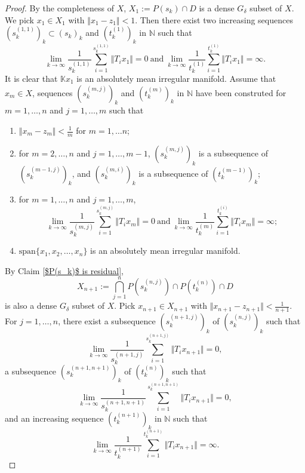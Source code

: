 \documentclass[12pt,a4paper]{amsart}
\theoremstyle{definition}
\theoremstyle{plain}
\begin{document}
\begin{proof}
    By the completeness of $X$, $X_1:=P(s_k)\cap D$ is a dense $G_{\delta}$ subset of $X$.
    We pick $x_1\in X_1$ with $\Vert x_1-z_1 \Vert <1$.
    Then there exist two increasing sequences $(s_k^{(1,1)})_k\subset (s_k)_k$
    and $(t_k^{(1)})_k$ in $\mathbb{N}$ such that
    \[
        \lim_{k\to \infty} \frac{1}{s_k^{(1,1)} } \sum_{i=1}^{s_k^{(1,1)}} \Vert T_{i}x_1 \Vert =0 \
        \text{and} \
        \lim_{k\to \infty} \frac{1}{t_k^{(1)}} \sum_{i=1}^{t_k^{(1)}} \Vert T_{i}x_1 \Vert =\infty.
    \]
    It is clear that $\mathbb{K}x_1$ is an absolutely mean irregular manifold.
    Assume that $x_m\in X$, sequences $(s_k^{(m,j)})_k$ and $(t_k^{(m)})_k$ in $\mathbb{N}$ have been construted for $m=1, \ldots,n$ and $j=1,\ldots, m$ such that
    \begin{enumerate}
        \item $\Vert x_m-z_m \Vert <\frac{1}{m}$ for $m=1, \ldots n$;
        \item for $m=2,\ldots, n$ and $j=1,\ldots, m-1$,
              $(s_k^{(m,j)})_k$ is a subsequence of $(s_k^{(m-1,j)})_k$, and $(s_k^{(m,i)})_k$ is a subsequence of $(t_k^{(m-1)})_k$;
        \item for $m=1, \ldots, n$ and $j=1, \ldots, m$,
              \[
                  \lim_{k\to \infty} \frac{1}{s_k^{(m,j)}} \sum_{i=1}^{ s_k^{(m,j)} } \Vert T_{i} x_m \Vert =0 \
                  \text{and} \
                  \lim_{k\to \infty} \frac{1}{t_k^{(m)}} \sum_{i=1}^{ t_k^{(i)} } \Vert T_{i} x_m \Vert =\infty;
              \]
        \item $\text{span} \{x_1, x_2, \ldots, x_n\} $ is an absolutely mean irregular manifold.
    \end{enumerate}
    By Claim \ref{$P(s_k)$ is residual},
    \[
        X_{n+1}:= \bigcap_{j=1}^n P(s_k^{(n,j)}) \cap P(t_k^{(n)}) \cap D
    \]
    is also a dense $G_{\delta}$ subset of $X$.
    Pick $x_{n+1}\in X_{n+1}$ with $\Vert x_{n+1} -z_{n+1} \Vert <\frac{1}{n+1}$.
    For $j=1, \ldots, n$, there exist a subsequence $(s_k^{(n+1, j)})_k$ of $(s_k^{(n, j)})_k$ such that
    \[
        \lim_{k\to \infty} \frac{1}{s_k^{(n+1, j)}} \sum_{i=1}^{s_k^{(n+1, j)}} \Vert T_{i} x_{n+1} \Vert =0,
    \]
    a subsequence $(s_k^{(n+1, n+1)})_k$ of $(t_k^{(n)})_k$ such that
    \[
        \lim_{k\to \infty} \frac{1}{s_k^{(n+1, n+1)}} \sum_{i=1}^{s_k^{(n+1, n+1)}} \Vert T_{i} x_{n+1} \Vert =0,
    \]
    and an increasing sequence $(t_k^{(n+1)})_k$ in $\mathbb{N}$ such that
    \[
        \lim_{k\to \infty} \frac{1}{t_k^{(n+1)}} \sum_{i=1}^{t_k^{(n+1)}} \Vert T_{i} x_{n+1} \Vert =\infty.
\]
\end{proof}
\end{document}
